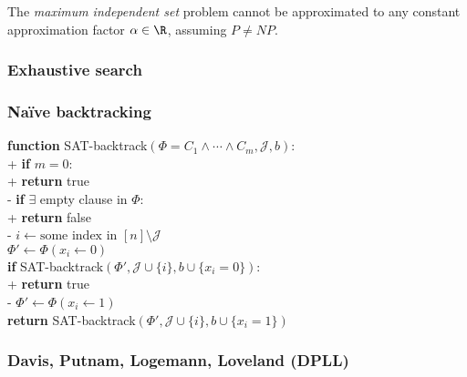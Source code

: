 \documentclass{article}
\begin{document}
\begin{theorem}
	The \emph{maximum independent set} problem cannot be approximated to
	any constant approximation factor $\alpha\in\R$, assuming $P\not= NP$.
\end{theorem}

\subsubsection{Exhaustive search}

\subsubsection{Na\"ive backtracking}

\begin{pseudo}
\textbf{function} \textsf{SAT-backtrack}$(\Phi=C_1\wedge\cdots\wedge C_m, \mathcal{J}, b)$:\\+
	\textbf{if} $m=0$:\\+ \textbf{return} \textsf{true}\\-
	\textbf{if} $\exists$ empty clause in $\Phi$:\\+
		\textbf{return} \textsf{false}\\-
    $i\leftarrow\text{some index in $[n]\setminus\mathcal{J}$}$\\
	$\Phi'\leftarrow\Phi(x_i\leftarrow 0)$\\
	\textbf{if} \textsf{SAT-backtrack}$(\Phi', \mathcal{J}\cup\{i\}, b\cup\{x_i=0\})$:\\+
		\textbf{return} \textsf{true}\\-
	$\Phi'\leftarrow\Phi(x_i\leftarrow 1)$\\
	\textbf{return} \textsf{SAT-backtrack}$(\Phi',\mathcal{J}\cup\{i\}, b\cup\{x_i=1\})$
\end{pseudo}

\subsubsection{Davis, Putnam, Logemann, Loveland (DPLL)}
\end{document}
